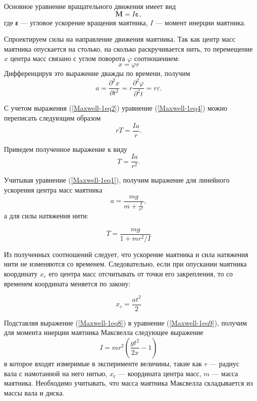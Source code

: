 \documentclass[14pt,a4paper,oneside]{extarticle}	%
\begin{document}
	Основное уравнение вращательного движения имеет вид
	\begin{equation}\label{Maxwell-1eq2}
	\textbf{M} = I\textbf{ε},
	\end{equation}
	где \textbf{ε} — угловое ускорение вращения маятника, $ I $ — момент инерции маятника.
	
	Спроектируем силы на направление движения маятника.  
	Так как центр масс маятника опускается на столько, на сколько раскручивается нить, то перемещение $ x $ центра масс связано с углом поворота $ \varphi $ соотношением:
	\begin{equation}\label{Maxwell-1eq3}
	x = \varphi r
	\end{equation}
	Дифференцируя это выражение дважды по времени, получим
	\begin{equation}\label{Maxwell-1eq4}
	a = \frac{\partial^{2} x}{\partial t^{2}} = r\frac{\partial^{2} \varphi}{\partial^{2} t} = r \varepsilon.
	\end{equation}
	
	С учетом выражения (\ref{Maxwell-1eq2}) уравнение (\ref{Maxwell-1eq4}) можно переписать следующим образом 
	\begin{equation}\label{Maxwell-1eq5}
	rT = \frac{Ia}{r}.
	\end{equation}
	
	Приведем полученное выражение к виду
	\begin{equation}\label{Maxwell-1eq6}
	T = \frac{Ia}{r^{2}}.
	\end{equation}
	
	Учитывая уравнение (\ref{Maxwell-1eq1}), получим выражение для линейного ускорения центра масс маятника
	\begin{equation}\label{Maxwell-1eq7}
	a = \frac{mg}{m + \frac{I}{r^{2}}},
	\end{equation}
	а для силы натяжения нити:
	
	\begin{equation}\label{Maxwell-1eq8}
	T = \frac{mg}{1 + mr^2/I}
	\end{equation}
	
	Из полученных соотношений следует, что ускорение маятника и сила натяжения нити не изменяются со временем. 
	Следовательно, если при опускании маятника координату $ x_c $ его центра масс отсчитывать от точки его закрепления, то со временем координата меняется по закону:
	
	\begin{equation}\label{Maxwell-1eq9}
	x_c = \frac{at^{2}}{2}
	\end{equation}
	
	Подставляя выражение (\ref{Maxwell-1eq8}) в уравнение (\ref{Maxwell-1eq9}), получим для момента инерции маятника Максвелла следующее выражение
	\begin{equation}\label{Maxwell-1eq10}
	I = mr^{2}\left(\frac{gt^{2}}{2x} - 1 \right) 
	\end{equation}
	в которое входят измеримые в эксперименте величины, такие как $ r $ — радиус вала с намотанной на него нитью, $ x_с $ — координата центра масс, $ m $ — масса маятника.
	Необходимо учитывать, что масса маятника Максвелла складывается из массы вала и диска.
	
	
\end{document}
